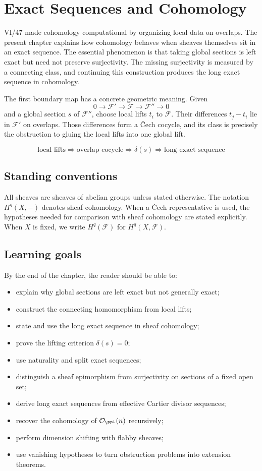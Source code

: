 \chapter{Exact Sequences and Cohomology}
\label{ch:vi48-exact-sequences-and-cohomology}

VI/47 made cohomology computational by organizing local data on overlaps.  The present chapter explains how cohomology behaves when sheaves themselves sit in an exact sequence.  The essential phenomenon is that taking global sections is left exact but need not preserve surjectivity.  The missing surjectivity is measured by a connecting class, and continuing this construction produces the long exact sequence in cohomology.

The first boundary map has a concrete geometric meaning.  Given
\[
0\to\mathcal F'\to\mathcal F\to\mathcal F''\to0
\]
and a global section $s$ of $\mathcal F''$, choose local lifts $t_i$ to $\mathcal F$.  Their differences $t_j-t_i$ lie in $\mathcal F'$ on overlaps.  Those differences form a \v{C}ech cocycle, and its class is precisely the obstruction to gluing the local lifts into one global lift.

\[
\boxed{\text{local lifts}\Longrightarrow\text{overlap cocycle}\Longrightarrow\delta(s)\Longrightarrow\text{long exact sequence}}
\]

\section*{Standing conventions}
All sheaves are sheaves of abelian groups unless stated otherwise.  The notation $H^q(X,-)$ denotes sheaf cohomology.  When a \v{C}ech representative is used, the hypotheses needed for comparison with sheaf cohomology are stated explicitly.  When $X$ is fixed, we write $H^q(\mathcal F)$ for $H^q(X,\mathcal F)$.

\section*{Learning goals}
By the end of the chapter, the reader should be able to:
\begin{itemize}
\item explain why global sections are left exact but not generally exact;
\item construct the connecting homomorphism from local lifts;
\item state and use the long exact sequence in sheaf cohomology;
\item prove the lifting criterion $\delta(s)=0$;
\item use naturality and split exact sequences;
\item distinguish a sheaf epimorphism from surjectivity on sections of a fixed open set;
\item derive long exact sequences from effective Cartier divisor sequences;
\item recover the cohomology of $\mathcal O_{\PP^1}(n)$ recursively;
\item perform dimension shifting with flabby sheaves;
\item use vanishing hypotheses to turn obstruction problems into extension theorems.
\end{itemize}

